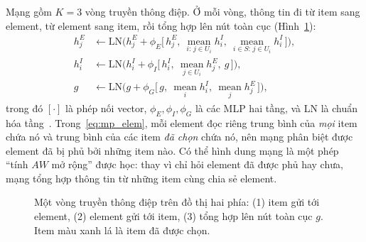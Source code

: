 Mạng gồm $K=3$ vòng truyền thông điệp. Ở mỗi vòng, thông tin đi từ item sang element, từ element sang item, rồi tổng hợp lên nút toàn cục (Hình~\ref{fig:gnn}):
\begin{align}
h^E_j &\leftarrow \mathrm{LN}\Big(h^E_j+\phi_E\big[\,h^E_j,\ \operatorname*{mean}_{i:\,j\in U_i}h^I_i,\ \operatorname*{mean}_{i\in S:\,j\in U_i}h^I_i\,\big]\Big), \label{eq:mp_elem}\\
h^I_i &\leftarrow \mathrm{LN}\Big(h^I_i+\phi_I\big[\,h^I_i,\ \operatorname*{mean}_{j\in U_i}h^E_j,\ g\,\big]\Big), \label{eq:mp_item}\\
g &\leftarrow \mathrm{LN}\Big(g+\phi_G\big[\,g,\ \operatorname*{mean}_{i}h^I_i,\ \operatorname*{mean}_{j}h^E_j\,\big]\Big), \label{eq:mp_glob}
\end{align}
trong đó $[\cdot]$ là phép nối vector, $\phi_E,\phi_I,\phi_G$ là các MLP hai tầng, và LN là chuẩn hóa tầng~\cite{Ba2016}. Trong~\eqref{eq:mp_elem}, mỗi element đọc riêng trung bình của \emph{mọi} item chứa nó và trung bình của các item \emph{đã chọn} chứa nó, nên mạng phân biệt được element đã bị phủ bởi những item nào. Có thể hình dung mạng là một phép ``tính $AW$ mở rộng'' được học: thay vì chỉ hỏi element đã được phủ hay chưa, mạng tổng hợp thông tin từ những item cùng chia sẻ element.

\begin{figure}[H]
\centering
{}
\caption{Một vòng truyền thông điệp trên đồ thị hai phía: (1) item gửi tới element, (2) element gửi tới item, (3) tổng hợp lên nút toàn cục $g$. Item màu xanh lá là item đã được chọn.}
\label{fig:gnn}
\end{figure}

